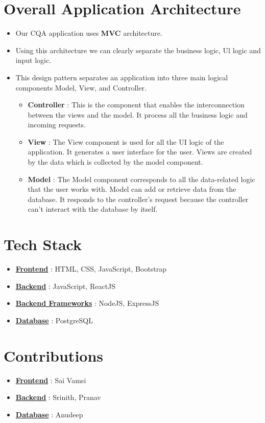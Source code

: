 \documentclass[12pt,a4paper]{article}
\begin{document}
	\section{Overall Application Architecture}
	\begin{itemize}
		\item Our CQA application uses \textbf{MVC} architecture.
		\item Using this architecture we can clearly separate the business logic, Ul logic and input logic.
		\item This design pattern separates an application into three main logical components Model, View, and Controller.
		\begin{itemize}
			\item \textbf{Controller} : This is the component that enables the interconnection between the views and the model. It process all the business logic and incoming requests.
			\item \textbf{View} : The View component is used for all the UI logic of the application. It generates a user interface for the user. Views are created by the data which is collected by the model component.
			\item \textbf{Model} : The Model component corresponds to all the data-related logic that the user works with. Model can add or retrieve data from the database. It responds to the controller’s request because the controller can’t interact with the database by itself.
		\end{itemize}

	\end{itemize}
	\section{Tech Stack}
	\begin{itemize}
		\item \textbf{\underline{Frontend}} : HTML, CSS, JavaScript, Bootstrap
		\item \textbf{\underline{Backend}} : JavaScript,  ReactJS
		\item \textbf{\underline{Backend Frameworks}} : NodeJS, ExpressJS
		\item \textbf{\underline{Database}} : PostgreSQL
	\end{itemize}
	\section{Contributions}
	\begin{itemize}
		\item \textbf{\underline{Frontend}} : Sai Vamsi
		\item \textbf{\underline{Backend}}  : Srinith, Pranav 
		\item \textbf{\underline{Database}} : Anudeep
	\end{itemize}
	
\end{document}
